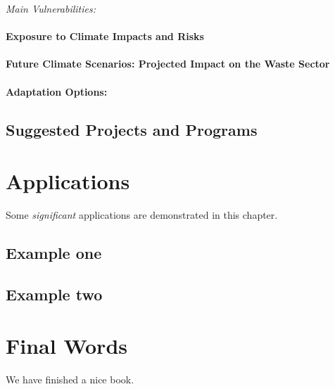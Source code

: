 \documentclass[
]{book}
\begin{document}
\emph{Main Vulnerabilities:}

\hypertarget{exposure-to-climate-impacts-and-risks-9}{%
\subsubsection{Exposure to Climate Impacts and Risks}\label{exposure-to-climate-impacts-and-risks-9}}

\hypertarget{future-climate-scenarios-projected-impact-on-the-waste-sector}{%
\subsubsection{Future Climate Scenarios: Projected Impact on the Waste Sector}\label{future-climate-scenarios-projected-impact-on-the-waste-sector}}

\hypertarget{adaptation-options-9}{%
\subsubsection{Adaptation Options:}\label{adaptation-options-9}}

\hypertarget{suggested-projects-and-programs}{%
\section{Suggested Projects and Programs}\label{suggested-projects-and-programs}}

\hypertarget{applications}{%
\chapter{Applications}\label{applications}}

Some \emph{significant} applications are demonstrated in this chapter.

\hypertarget{example-one}{%
\section{Example one}\label{example-one}}

\hypertarget{example-two}{%
\section{Example two}\label{example-two}}

\hypertarget{final-words}{%
\chapter{Final Words}\label{final-words}}

We have finished a nice book.

  
\end{document}
